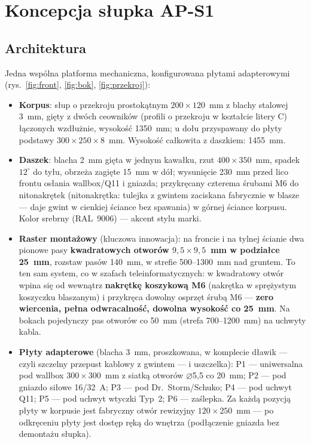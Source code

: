 \documentclass[11pt,a4paper]{article}
\begin{document}
\section{Koncepcja słupka AP-S1}
\subsection{Architektura}
Jedna wspólna platforma mechaniczna, konfigurowana płytami adapterowymi (rys.~\ref{fig:front},
\ref{fig:bok}, \ref{fig:przekroj}):
\begin{itemize}
\item \textbf{Korpus}: słup o przekroju prostokątnym $200\times120$~mm z blachy stalowej 3~mm, gięty
z dwóch ceowników (profili o przekroju w kształcie litery C) łączonych wzdłużnie, wysokość 1350~mm;
u dołu przyspawany do płyty podstawy $300\times250\times8$~mm. Wysokość całkowita z daszkiem: 1455~mm.
\item \textbf{Daszek}: blacha 2~mm gięta w jednym kawałku, rzut $400\times350$~mm, spadek $12^\circ$
do tyłu, obrzeża zagięte 15~mm w dół; wysunięcie 230~mm przed lico frontu osłania wallbox/Q11
i gniazda; przykręcany czterema śrubami M6 do nitonakrętek (nitonakrętka: tulejka z gwintem
zaciskana fabrycznie w blasze --- daje gwint w cienkiej ściance bez spawania) w górnej ściance korpusu.
Kolor srebrny (RAL~9006) --- akcent stylu marki.
\item \textbf{Raster montażowy} (kluczowa innowacja): na froncie i na tylnej ścianie dwa pionowe pasy
\textbf{kwadratowych otworów $9{,}5\times9{,}5$~mm w podziałce 25~mm}, rozstaw pasów 140~mm, w strefie
500--1300~mm nad gruntem. To ten sam system, co w szafach teleinformatycznych: w kwadratowy otwór
wpina się od wewnątrz \textbf{nakrętkę koszykową M6} (nakrętka w sprężystym koszyczku blaszanym)
i przykręca dowolny osprzęt śrubą M6 --- \textbf{zero wiercenia, pełna odwracalność, dowolna wysokość
co 25~mm}. Na bokach pojedynczy pas otworów co 50~mm (strefa 700--1200~mm) na uchwyty kabla.
\item \textbf{Płyty adapterowe} (blacha 3~mm, proszkowana, w komplecie dławik --- czyli szczelny
przepust kablowy z gwintem --- i uszczelka): P1 --- uniwersalna pod wallbox $300\times300$~mm z siatką
otworów $\varnothing$5{,}5 co 20~mm; P2 --- pod gniazdo siłowe 16/32~A; P3 --- pod Dr.~Storm/Schuko;
P4 --- pod uchwyt Q11; P5 --- pod uchwyt wtyczki Typ~2; P6 --- zaślepka. Za każdą pozycją płyty
w korpusie jest fabryczny otwór rewizyjny $120\times250$~mm --- po odkręceniu płyty jest dostęp ręką
do wnętrza (podłączenie gniazda bez demontażu słupka).

\end{itemize}
\end{document}
